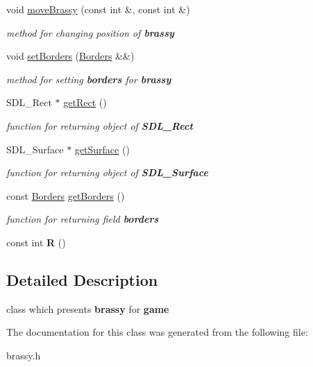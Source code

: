 \begin{DoxyCompactItemize}
\mbox{\label{class_brassy_a4087a23eec550cd696ff58ffe855c243}} 
void \mbox{\hyperlink{class_brassy_a4087a23eec550cd696ff58ffe855c243}{move\+Brassy}} (const int \&, const int \&)
\begin{DoxyCompactList}\small\item\em {\itshape method} for changing position of {\bfseries{brassy}} \end{DoxyCompactList}\item 
\mbox{\label{class_brassy_a71b52699f05c1ef92006c4140a36e100}} 
void \mbox{\hyperlink{class_brassy_a71b52699f05c1ef92006c4140a36e100}{set\+Borders}} (\mbox{\hyperlink{class_borders}{Borders}} \&\&)
\begin{DoxyCompactList}\small\item\em {\itshape method} for setting {\bfseries{borders}} for {\bfseries{brassy}} \end{DoxyCompactList}\item 
\mbox{\label{class_brassy_a88ca52a1067d860a776fffdc5ab980d7}} 
S\+D\+L\+\_\+\+Rect $\ast$ \mbox{\hyperlink{class_brassy_a88ca52a1067d860a776fffdc5ab980d7}{get\+Rect}} ()
\begin{DoxyCompactList}\small\item\em {\itshape function} for returning object of {\bfseries{S\+D\+L\+\_\+\+Rect}} \end{DoxyCompactList}\item 
\mbox{\label{class_brassy_ac11538ee66e1af99230b060a08b75fb4}} 
S\+D\+L\+\_\+\+Surface $\ast$ \mbox{\hyperlink{class_brassy_ac11538ee66e1af99230b060a08b75fb4}{get\+Surface}} ()
\begin{DoxyCompactList}\small\item\em {\itshape function} for returning object of {\bfseries{S\+D\+L\+\_\+\+Surface}} \end{DoxyCompactList}\item 
\mbox{\label{class_brassy_a60c3e9f032506c998d43fca78344029f}} 
const \mbox{\hyperlink{class_borders}{Borders}} \mbox{\hyperlink{class_brassy_a60c3e9f032506c998d43fca78344029f}{get\+Borders}} ()
\begin{DoxyCompactList}\small\item\em {\itshape function} for returning {\itshape field} {\bfseries{borders}} \end{DoxyCompactList}\item 
\mbox{\label{class_brassy_acd645a432aecd71d205486afee16ef44}} 
const int {\bfseries R} ()
\end{DoxyCompactItemize}


\subsection{Detailed Description}
class which presents {\bfseries{brassy}} for {\bfseries{game}} 

The documentation for this class was generated from the following file\+:\begin{DoxyCompactItemize}
\item 
brassy.\+h\end{DoxyCompactItemize}

